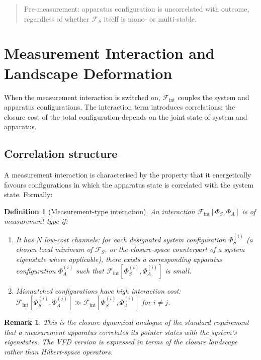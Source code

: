 \documentclass[12pt]{article}
\newtheorem{definition}[theorem]{Definition}
\newtheorem{remark}[theorem]{Remark}
\newcommand{\Fcal}{\mathcal{F}}
\begin{document}
\begin{quote}
Pre-measurement: apparatus configuration is uncorrelated with outcome, regardless of whether $\Fcal_S$ itself is mono- or multi-stable.
\end{quote}

\section{Measurement Interaction and Landscape Deformation}\label{sec:deformation}

When the measurement interaction is switched on, $\Fcal_{\mathrm{int}}$ couples the system and apparatus configurations. The interaction term introduces correlations: the closure cost of the total configuration depends on the joint state of system and apparatus.

\subsection{Correlation structure}

A measurement interaction is characterised by the property that it energetically favours configurations in which the apparatus state is correlated with the system state. Formally:

\begin{definition}[Measurement-type interaction]\label{def:measurement}
An interaction $\Fcal_{\mathrm{int}}[\Phi_S, \Phi_A]$ is of \textit{measurement type} if:
\begin{enumerate}
    \item It has $N$ low-cost channels: for each designated system configuration $\Phi_S^{(i)}$ (a chosen local minimum of $\Fcal_S$, or the closure-space counterpart of a system eigenstate where applicable), there exists a corresponding apparatus configuration $\Phi_A^{(i)}$ such that $\Fcal_{\mathrm{int}}[\Phi_S^{(i)}, \Phi_A^{(i)}]$ is small.
    \item Mismatched configurations have high interaction cost: $\Fcal_{\mathrm{int}}[\Phi_S^{(i)}, \Phi_A^{(j)}] \gg \Fcal_{\mathrm{int}}[\Phi_S^{(i)}, \Phi_A^{(i)}]$ for $i \neq j$.
\end{enumerate}
\end{definition}

\begin{remark}
This is the closure-dynamical analogue of the standard requirement that a measurement apparatus correlates its pointer states with the system's eigenstates. The VFD version is expressed in terms of the closure landscape rather than Hilbert-space operators.
\end{remark}
\end{document}

